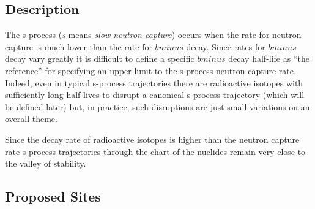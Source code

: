 \subsection{Description}
The s-process ({\it s} means {\it slow neutron capture}) occurs when
the rate for neutron capture is much lower than the rate
for $bminus$ decay.  Since rates for $bminus$ decay vary greatly
it is difficult to define a specific $bminus$ decay half-life as ``the
reference'' for specifying an upper-limit to the s-process neutron
capture rate.  Indeed, even in typical
s-process trajectories there are radioactive isotopes with
sufficiently long half-lives to disrupt a canonical s-process
trajectory (which will be defined later) but, in practice, such
disruptions are just small variations on an overall theme.  

Since the decay rate of radioactive isotopes is higher than the
neutron capture rate s-process trajectories through the chart of the
nuclides remain very close to the valley of stability.


\subsection{Proposed Sites}
